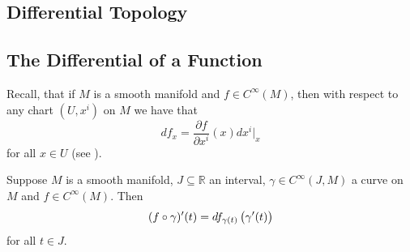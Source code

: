 \tableofcontents

\mainmatter

\renewcommand*{\thefootnote}{\arabic{footnote}}




\appendix
\renewcommand{\theequation}{\thechapter.\arabic{equation}}

\begin{appendix}
	\chapter{Differential Topology}
	\section*{The Differential of a Function}
	Recall, that if $M$ is a smooth manifold and $f \in C^\infty(M)$, then with respect to any chart $(U,x^i)$ on $M$ we have that
	\begin{equation}
		\label{eq:differential_of_a_function}
		df_x = \frac{\partial f}{\partial x^i}(x)dx^i\vert_x
	\end{equation}
	\noindent for all $x \in U$ (see \cite[281]{lee:smooth_manifolds:2013}).

	\begin{proposition}
		\label{prop:derivative_of_a_function_along_a_curve}
		Suppose $M$ is a smooth manifold, $J \subseteq \mathbb{R}$ an interval, $\gamma \in C^\infty(J,M)$ a curve on $M$ and $f \in C^\infty(M)$. Then
		\begin{equation*}
			(f \circ \gamma)'(t) = df_{\gamma(t)}\del[1]{\gamma'(t)}
		\end{equation*}
		\noindent for all $t \in J$.
	\end{proposition}
\end{appendix}

\printbibliography
\printindex

